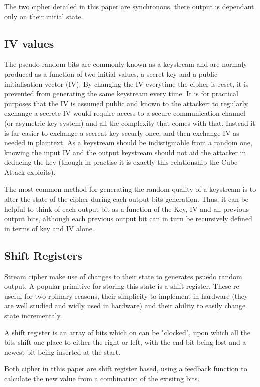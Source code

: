 \documentclass{report}
\begin{document}
The two cipher detailed in this paper are synchronous, there output is dependant only on their initial state.

\subsection*{IV values}
The pseudo random bits are commonly known as a keystream and are normaly produced as a function of two initial values, a secret key and a public initialisation vector (IV). By changing the IV everytime the cipher is reset, it is prevented from generating the same keystream every time. It is for practical purposes that the IV is assumed public and known to the attacker: to regularly exchange a secrete IV would require access to a secure communication channel (or asymetric key system) and all the complexity that comes with that. Instead it is far easier to exchange a secreat key securly once, and then exchange IV as needed in plaintext. As a keystream should be indistiguiable from a random one, knowing the input IV and the output keystream should not aid the attacker in deducing the key (though in practise it is exactly this relationship the Cube Attack exploits).
 
The most common method for generating the random quality of a keystream is to alter the state of the cipher during each output bits generation. Thus, it can be helpful to think of each output bit as a function of the Key, IV and all previous output bits, although each previous output bit can in turn be recursively defined in terms of key and IV alone.

\subsection*{Shift Registers}
Stream cipher make use of changes to their state to generates psuedo random output. A popular primitive for storing this state is a shift register. These re useful for two rpimary reasons, their simplicity to implement in hardware (they are well studied and widly used in hardware) and their ability to easily change state incrementaly.

A shift register is an array of bits which on can be "clocked", upon which all the bits shift one place to either the right or left, with the end bit being lost and a newest bit being inserted at the start.

Both cipher in tthis paper are shift register based, using a feedback function to calculate the new value from a combination of the exisitng bits.
\end{document}
